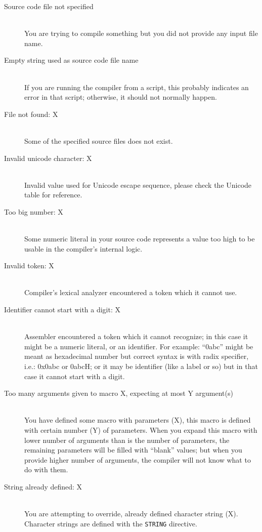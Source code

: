 \begin{description}
        \item[Source code file not specified]~\\
            You are trying to compile something but you did not provide any input file name.
        \item[Empty string used as source code file name]~\\
            If you are running the compiler from a script, this probably indicates an error in that script; otherwise, it should not normally happen.
        \item[File not found: X]~\\
            Some of the specified source files does not exist.
        \item[Invalid unicode character: X]~\\
            Invalid value used for Unicode escape sequence, please check the Unicode table for reference.
        \item[Too big number: X]~\\
            Some numeric literal in your source code represents a value too high to be usable in the compiler's internal logic.
        \item[Invalid token: X]~\\
            Compiler's lexical analyzer encountered a token which it cannot use.
        \item[Identifier cannot start with a digit: X]~\\
            Assembler encountered a token which it cannot recognize; in this case it might be a numeric literal, or an identifier. For example: ``0abc'' might be meant as hexadecimal number but correct syntax is with radix specifier, i.e.: 0x0abc or 0abcH; or it may be identifier (like a label or so) but in that case it cannot start with a digit.
        \item[Too many arguments given to macro X, expecting at most Y argument(s)]~\\
            You have defined some macro with parameters (X), this macro is defined with certain number (Y) of parameters. When you expand this macro with lower number of arguments than is the number of parameters, the remaining parameters will be filled with ``blank'' values; but when you provide higher number of arguments, the compiler will not know what to do with them.
        \item[String already defined: X]~\\
            You are attempting to override, already defined character string (X). Character strings are defined with the \texttt{STRING} directive.

\end{description}
